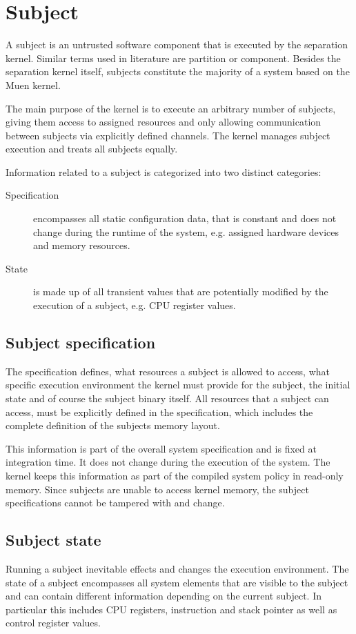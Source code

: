 \section{Subject}\label{sec:subject}
A subject is an untrusted software component that is executed by the separation
kernel. Similar terms used in literature are partition or component. Besides the
separation kernel itself, subjects constitute the majority of a system based on
the Muen kernel.

The main purpose of the kernel is to execute an arbitrary number of subjects,
giving them access to assigned resources and only allowing communication between
subjects via explicitly defined channels. The kernel manages subject execution
and treats all subjects equally.

Information related to a subject is categorized into two distinct categories:

\begin{description}
	\item[Specification] encompasses all static configuration data, that is
		constant and does not change during the runtime of the system, e.g.
		assigned hardware devices and memory resources.
	\item[State] is made up of all transient values that are potentially
		modified by the execution of a subject, e.g. CPU register values.
\end{description}

\subsection{Subject specification}
The specification defines, what resources a subject is allowed to access, what
specific execution environment the kernel must provide for the subject, the
initial state and of course the subject binary itself. All resources that a
subject can access, must be explicitly defined in the specification, which
includes the complete definition of the subjects memory layout.

This information is part of the overall system specification and is fixed at
integration time. It does not change during the execution of the system. The
kernel keeps this information as part of the compiled system policy in read-only
memory. Since subjects are unable to access kernel memory, the subject
specifications cannot be tampered with and change.

\subsection{Subject state}
Running a subject inevitable effects and changes the execution environment. The
state of a subject encompasses all system elements that are visible to the
subject and can contain different information depending on the current subject.
In particular this includes CPU registers, instruction and stack pointer as well
as control register values.

